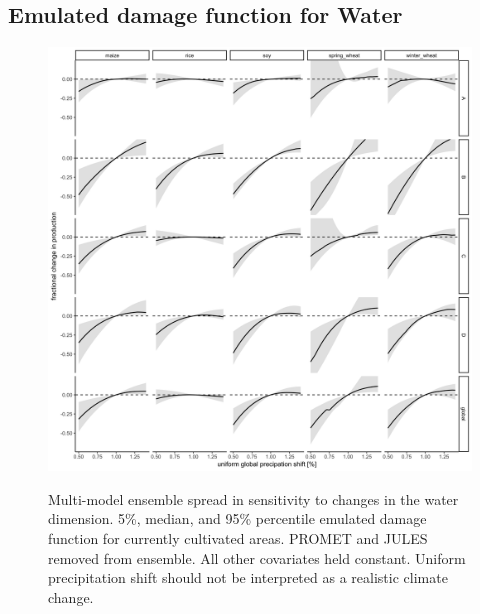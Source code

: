 \documentclass[10pt]{article}
\begin{document}
\subsection{Emulated damage function for Water}
\begin{figure}[h!]
\includegraphics[width=\textwidth]{s_water.png}\\
\caption{Multi-model ensemble spread in sensitivity to changes in the water dimension. 5\%, median,  and 95\% percentile emulated damage function for currently cultivated areas. PROMET and JULES removed from ensemble. All other covariates held constant. Uniform precipitation shift should not be interpreted as a realistic climate change.}
\label{fig:water}
\end{figure}
\clearpage
\end{document}
